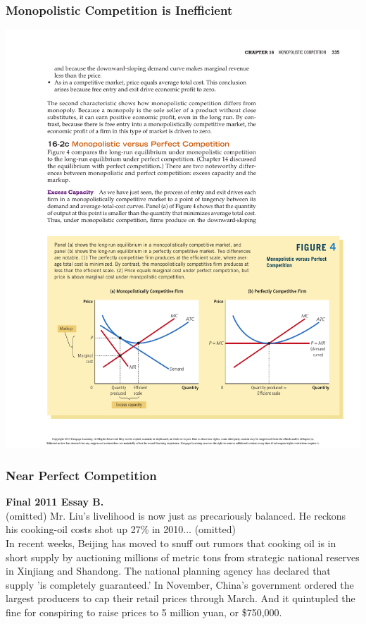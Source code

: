 \documentclass[12pt, xcolor=dvipsnames]{beamer}
\begin{document}
\begin{frame}
\frametitle{\bf Monopolistic Competition is Inefficient}
\begin{center}
\includegraphics[width=\linewidth]{figures/14-10.pdf}
\end{center}
\end{frame}





\begin{frame}
\frametitle{\bf Near Perfect Competition}
\small \textsf{\bfseries Final 2011 Essay B.} \\
(omitted) Mr. Liu's livelihood is now just as precariously balanced. He reckons his cooking-oil costs shot up 27\% in 2010... (omitted)\\
In recent weeks, Beijing has moved to snuff out rumors that cooking oil is in short supply by auctioning millions of metric tons from strategic national reserves in Xinjiang and Shandong. The national planning agency has declared that supply 'is completely guaranteed.' In November, China's government ordered the largest producers to cap their retail prices through March. And it quintupled the fine for conspiring to raise prices to 5 million yuan, or \$750,000.
\end{frame}
\end{document}
